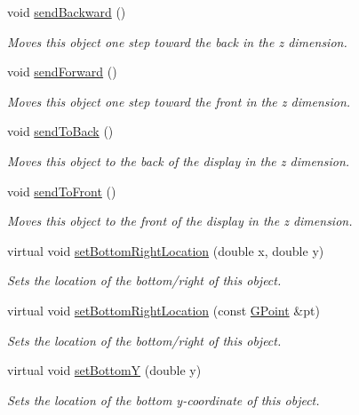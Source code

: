 \begin{DoxyCompactItemize}
void \mbox{\hyperlink{classGObject_ab6747f40313c531c2db32edb5b63b9b7}{send\+Backward}} ()
\begin{DoxyCompactList}\small\item\em Moves this object one step toward the back in the {\itshape z} dimension. \end{DoxyCompactList}\item 
void \mbox{\hyperlink{classGObject_a710b3e449c9facba7847c91ab170d281}{send\+Forward}} ()
\begin{DoxyCompactList}\small\item\em Moves this object one step toward the front in the {\itshape z} dimension. \end{DoxyCompactList}\item 
void \mbox{\hyperlink{classGObject_a0f7f1efbb7fd46dde2867c4ad0330896}{send\+To\+Back}} ()
\begin{DoxyCompactList}\small\item\em Moves this object to the back of the display in the {\itshape z} dimension. \end{DoxyCompactList}\item 
void \mbox{\hyperlink{classGObject_aee33d68488e46827ef55fac07f40a9b2}{send\+To\+Front}} ()
\begin{DoxyCompactList}\small\item\em Moves this object to the front of the display in the {\itshape z} dimension. \end{DoxyCompactList}\item 
virtual void \mbox{\hyperlink{classGObject_a71ff7b16b8f1bdc4a1ce9f30cf8b87d8}{set\+Bottom\+Right\+Location}} (double x, double y)
\begin{DoxyCompactList}\small\item\em Sets the location of the bottom/right of this object. \end{DoxyCompactList}\item 
virtual void \mbox{\hyperlink{classGObject_ac6f7320321182f1d18c1c0fa97d5e941}{set\+Bottom\+Right\+Location}} (const \mbox{\hyperlink{classGPoint}{G\+Point}} \&pt)
\begin{DoxyCompactList}\small\item\em Sets the location of the bottom/right of this object. \end{DoxyCompactList}\item 
virtual void \mbox{\hyperlink{classGObject_a4b20e93c2a2597484f74ee5caa71f41f}{set\+BottomY}} (double y)
\begin{DoxyCompactList}\small\item\em Sets the location of the bottom y-\/coordinate of this object. \end{DoxyCompactList}\item 

\end{DoxyCompactItemize}
